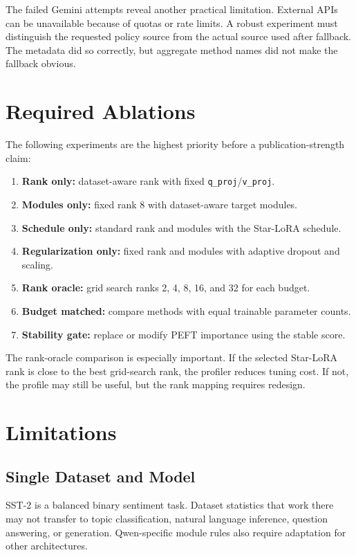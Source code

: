The failed Gemini attempts reveal another practical limitation. External APIs can be unavailable
because of quotas or rate limits. A robust experiment must distinguish the requested policy source
from the actual source used after fallback. The metadata did so correctly, but aggregate method
names did not make the fallback obvious.

\section{Required Ablations}

The following experiments are the highest priority before a publication-strength claim:
\begin{enumerate}
  \item \textbf{Rank only:} dataset-aware rank with fixed \texttt{q\_proj}/\texttt{v\_proj}.
  \item \textbf{Modules only:} fixed rank 8 with dataset-aware target modules.
  \item \textbf{Schedule only:} standard rank and modules with the Star-LoRA schedule.
  \item \textbf{Regularization only:} fixed rank and modules with adaptive dropout and scaling.
  \item \textbf{Rank oracle:} grid search ranks 2, 4, 8, 16, and 32 for each budget.
  \item \textbf{Budget matched:} compare methods with equal trainable parameter counts.
  \item \textbf{Stability gate:} replace or modify PEFT importance using the stable score.
\end{enumerate}

The rank-oracle comparison is especially important. If the selected Star-LoRA rank is close to the
best grid-search rank, the profiler reduces tuning cost. If not, the profile may still be useful,
but the rank mapping requires redesign.

\section{Limitations}

\subsection{Single Dataset and Model}

SST-2 is a balanced binary sentiment task. Dataset statistics that work there may not transfer to
topic classification, natural language inference, question answering, or generation. Qwen-specific
module rules also require adaptation for other architectures.

